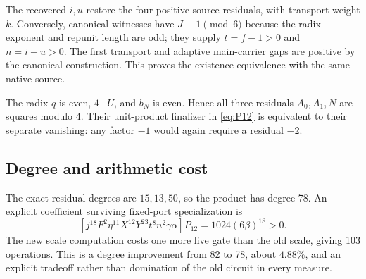 The recovered $i,u$ restore the four positive source residuals, with
transport weight $k$. Conversely, canonical witnesses have
$J\equiv1\pmod6$ because the radix exponent and repunit length are odd;
they supply $t=f-1>0$ and $n=i+u>0$. The first transport and adaptive
main-carrier gaps are positive by the canonical construction. This
proves the existence equivalence with the same native source.

The radix $q$ is even, $4\mid U$, and $b_N$ is even. Hence all three
residuals $A_0,A_1,N$ are squares modulo $4$. Their unit-product
finalizer in \eqref{eq:P12} is equivalent to their separate vanishing:
any factor $-1$ would again require a residual $-2$.

\subsection{Degree and arithmetic cost}

The exact residual degrees are $15,13,50$, so the product has degree 78.
An explicit coefficient surviving fixed-port specialization is
\[
 [j^{18}F^2\eta^{11}X^{12}Y^{23}t^8n^2\gamma\alpha]P_{12}
 =1024(6\beta)^{18}>0.
\]
The new scale computation costs one more live gate than the old scale,
giving 103 operations. This is a degree improvement from 82 to 78,
about $4.88\%$, and an explicit tradeoff rather than domination of the
old circuit in every measure.
